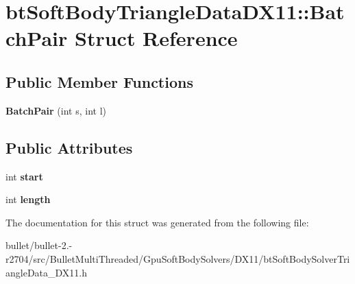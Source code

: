 \hypertarget{structbt_soft_body_triangle_data_d_x11_1_1_batch_pair}{\section{bt\+Soft\+Body\+Triangle\+Data\+D\+X11\+:\+:Batch\+Pair Struct Reference}
\label{structbt_soft_body_triangle_data_d_x11_1_1_batch_pair}
}
\subsection*{Public Member Functions}
\begin{DoxyCompactItemize}
\item 
\hypertarget{structbt_soft_body_triangle_data_d_x11_1_1_batch_pair_a496f16f0e86308e447dc186b979cce2d}{{\bfseries Batch\+Pair} (int s, int l)}\label{structbt_soft_body_triangle_data_d_x11_1_1_batch_pair_a496f16f0e86308e447dc186b979cce2d}

\end{DoxyCompactItemize}
\subsection*{Public Attributes}
\begin{DoxyCompactItemize}
\item 
\hypertarget{structbt_soft_body_triangle_data_d_x11_1_1_batch_pair_ab7d4e9176e6ca76c741b85b4d94f9c6a}{int {\bfseries start}}\label{structbt_soft_body_triangle_data_d_x11_1_1_batch_pair_ab7d4e9176e6ca76c741b85b4d94f9c6a}

\item 
\hypertarget{structbt_soft_body_triangle_data_d_x11_1_1_batch_pair_ac3e6a7c23ee2e06dd8c302d8f52a6ea2}{int {\bfseries length}}\label{structbt_soft_body_triangle_data_d_x11_1_1_batch_pair_ac3e6a7c23ee2e06dd8c302d8f52a6ea2}

\end{DoxyCompactItemize}


The documentation for this struct was generated from the following file\+:\begin{DoxyCompactItemize}
\item 
bullet/bullet-\/2.-\/r2704/src/\+Bullet\+Multi\+Threaded/\+Gpu\+Soft\+Body\+Solvers/\+D\+X11/bt\+Soft\+Body\+Solver\+Triangle\+Data\+\_\+\+D\+X11.\+h\end{DoxyCompactItemize}
